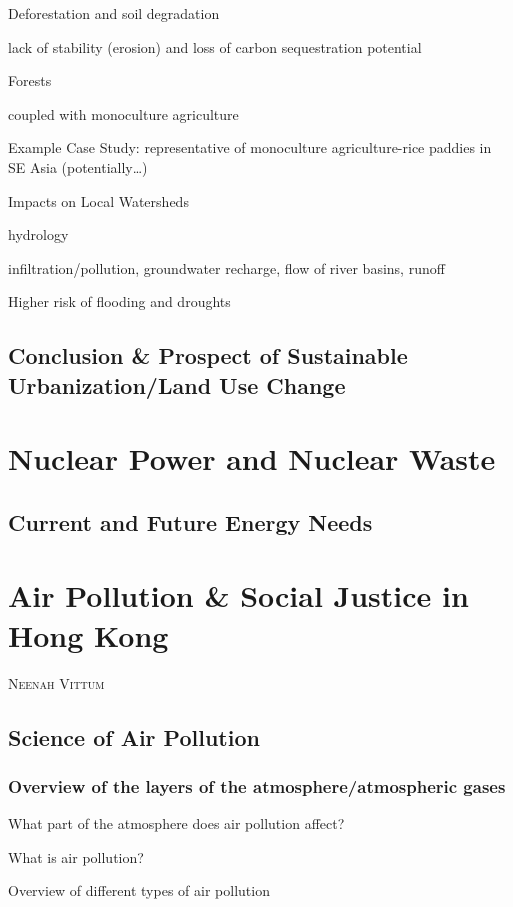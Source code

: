 \documentclass{book}\usepackage{knitr}
\makeatletter
\newcommand{\chapterauthor}[1]{%
  {\parindent0pt\vspace*{-25pt}%
  \linespread{1.1}\large\scshape#1%
  \par\nobreak\vspace*{35pt}}
  \@afterheading%
}
\makeatother
\begin{document}
Deforestation and soil degradation

lack of stability (erosion) and loss of carbon sequestration potential

Forests


coupled with monoculture agriculture

Example Case Study: representative of monoculture agriculture-rice paddies in SE Asia (potentially\ldots)


Impacts on Local Watersheds

hydrology 

infiltration/pollution, groundwater recharge, flow of river basins, runoff

Higher risk of flooding and droughts

\section{Conclusion \& Prospect of Sustainable Urbanization/Land Use Change}


\chapter{Nuclear Power and Nuclear Waste}

\section{Current and Future Energy Needs}



\chapter{Air Pollution \& Social Justice in Hong Kong}

\chapterauthor{Neenah Vittum}

\section{Science of Air Pollution}

\subsection{Overview of the layers of the atmosphere/atmospheric gases}

What part of the atmosphere does air pollution affect?

What is air pollution?

Overview of different types of air pollution
\end{document}
